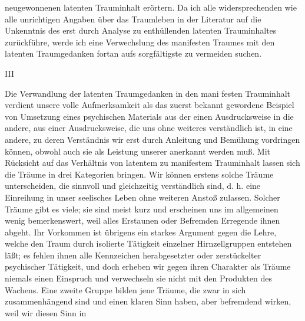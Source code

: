 \documentclass{article}
\begin{document}
         
            
            
            
        \pstart
        neugewonnenen latenten Trauminhalt erörtern. Da ich alle
               widersprechenden wie alle unrichtigen Angaben über das Traumleben in
               der Literatur auf die Unkenntnis des erst durch Analyse zu enthüllenden latenten
               Trauminhaltes zurückführe, werde ich eine Verwechslung des manifesten Traumes mit den
               latenten Traumgedanken fortan aufs sorgfältigste zu
                  vermeiden suchen.
        \pend
    
         
            
            
            
        \pstart
        III
        \pend
    
            
        \pstart
        Die Verwandlung der latenten Traumgedanken in den mani festen Trauminhalt
               verdient unsere volle Aufmerksamkeit als das zuerst bekannt gewordene Beispiel
               von Umsetzung eines psychischen Materials aus der einen
               Ausdrucksweise in die andere, aus einer Ausdrucksweise, die uns ohne weiteres
               verständlich ist, in eine andere, zu deren Verständnis wir erst durch Anleitung
               und Bemühung vordringen können, obwohl auch sie als Leistung unserer 
     anerkannt werden muß. Mit Rücksicht auf das Verhältnis von latentem zu
               manifestem Trauminhalt lassen sich die Träume in drei Kategorien bringen. Wir
               können erstens solche Träume unterscheiden, die sinnvoll und gleichzeitig verständlich sind, d. h. eine Einreihung in unser seelisches Leben ohne
               weiteren Anstoß zulassen. Solcher Träume gibt es viele; sie sind meist kurz und
               erscheinen uns im allgemeinen wenig bemerkenswert, weil alles
               Erstaunen oder Befremden Erregende ihnen abgeht. Ihr Vorkommen ist übrigens ein
               starkes Argument gegen die Lehre, welche den Traum durch isolierte
               Tätigkeit einzelner Hirnzellgruppen entstehen läßt; es fehlen ihnen alle
               Kennzeichen herabgesetzter oder zerstückelter psychischer Tätigkeit, und doch
               erheben wir gegen ihren Charakter als Träume niemals einen Einspruch und
               verwechseln sie nicht mit den Produkten des Wachens. Eine zweite Gruppe bilden
               jene Träume, die zwar in sich zusammenhängend sind und einen klaren Sinn
               haben, aber befremdend wirken, weil wir diesen Sinn
               in
        \pend
    
\end{document}
